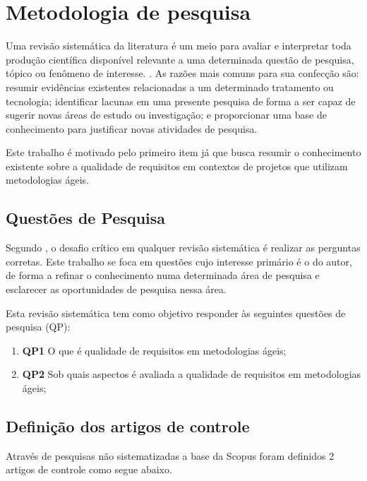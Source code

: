 \section{Metodologia de pesquisa}

Uma revisão sistemática da literatura é um meio para avaliar e interpretar toda produção científica disponível relevante a uma determinada questão de pesquisa, tópico ou fenômeno de interesse. \cite{Kitchenham_2007}. As razões mais comuns para sua confecção são: resumir evidências existentes relacionadas a um determinado tratamento ou tecnologia; identificar lacunas em uma presente pesquisa de forma a ser capaz de sugerir novas áreas de estudo ou investigação; e proporcionar uma base de conhecimento para justificar novas atividades de pesquisa.

Este trabalho é motivado pelo primeiro item já que busca resumir o conhecimento existente sobre a qualidade de requisitos em contextos de projetos que utilizam metodologias ágeis.

\subsection{Questões de Pesquisa}

Segundo \cite{Kitchenham_2007}, o desafio crítico em qualquer revisão sistemática é realizar as perguntas corretas. Este trabalho se foca em questões cujo interesse primário é o do autor, de forma a refinar o conhecimento numa determinada área de pesquisa e esclarecer as oportunidades de pesquisa nessa área. 

Esta revisão sistemática tem como objetivo responder às seguintes questões de pesquisa (QP):

\begin{enumerate}[label={}]
\item \textbf{QP1} O que é qualidade de requisitos em metodologias ágeis;
\item \textbf{QP2} Sob quais aspectos é avaliada a qualidade de requisitos em metodologias ágeis;
\end{enumerate}

\subsection{Definição dos artigos de controle}

Através de pesquisas não sistematizadas a base da Scopus foram definidos 2 artigos de controle como segue abaixo. 


